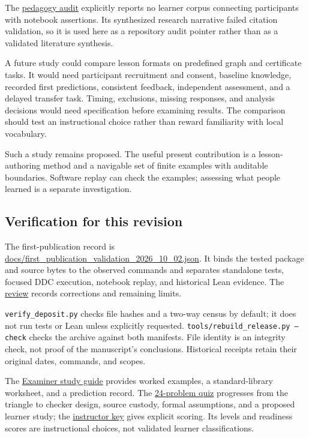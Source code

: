 \documentclass[
  11pt,
]{article}
\begin{document}
The
\href{https://github.com/dbccpage/the_symbol_game/blob/52cb5457f6c485ba548cfd292f6012a941ed22cf/education/pedagogy/teaching_and_learning_findings.md}{pedagogy
audit} explicitly reports no learner corpus connecting participants with
notebook assertions. Its synthesized research narrative failed citation
validation, so it is used here as a repository audit pointer rather than
as a validated literature synthesis.

A future study could compare lesson formats on predefined graph and
certificate tasks. It would need participant recruitment and consent,
baseline knowledge, recorded first predictions, consistent feedback,
independent assessment, and a delayed transfer task. Timing, exclusions,
missing responses, and analysis decisions would need specification
before examining results. The comparison should test an instructional
choice rather than reward familiarity with local vocabulary.

Such a study remains proposed. The useful present contribution is a
lesson-authoring method and a navigable set of finite examples with
auditable boundaries. Software replay can check the examples; assessing
what people learned is a separate investigation.

\hypertarget{verification-for-this-revision}{%
\subsection{Verification for this
revision}\label{verification-for-this-revision}}

The first-publication record is
\url{docs/first_publication_validation_2026_10_02.json}. It binds the
tested package and source bytes to the observed commands and separates
standalone tests, focused DDC execution, notebook replay, and historical
Lean evidence. The \href{docs/first_publication_review.md}{review}
records corrections and remaining limits.

\texttt{\nolinkurl{verify_deposit.py}} checks file hashes and a
two-way census by default; it does not run tests or Lean unless
explicitly requested.
\texttt{tools/rebuild\_release.py --check} checks the
archive against both manifests. File identity is an integrity check, not
proof of the manuscript's conclusions. Historical receipts retain their
original dates, commands, and scopes.

The \href{_lev_examiner_theoretical_minimum_quiz/study_guide.md}{Examiner
study guide} provides worked examples, a standard-library worksheet, and
a prediction record. The
\href{_lev_examiner_theoretical_minimum_quiz/quiz.md}{24-problem quiz}
progresses from the triangle to checker design, source custody, formal
assumptions, and a proposed learner study; the
\href{_lev_examiner_theoretical_minimum_quiz/instructor_key.md}{instructor
key} gives explicit scoring. Its levels and readiness scores are
instructional choices, not validated learner classifications.
\end{document}
